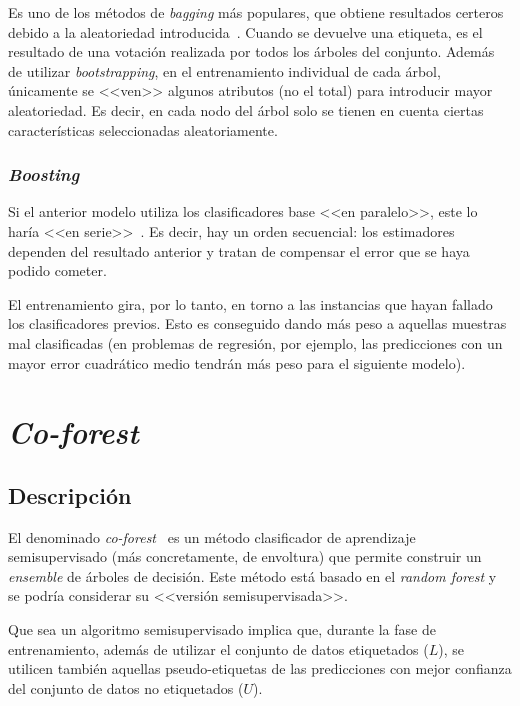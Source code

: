 Es uno de los métodos de \textit{bagging} más populares, que obtiene resultados certeros debido a la aleatoriedad introducida~\cite{originalCoForest2007}. Cuando se devuelve una etiqueta, es el resultado de una votación realizada por todos los árboles del conjunto. Además de utilizar \textit{bootstrapping}, en el entrenamiento individual de cada árbol, únicamente se <<ven>> algunos atributos (no el total) para introducir mayor aleatoriedad. Es decir, en cada nodo del árbol solo se tienen en cuenta ciertas características seleccionadas aleatoriamente.
	
\subsubsection{\textit{Boosting}}

Si el anterior modelo utiliza los clasificadores base <<en paralelo>>, este lo haría <<en serie>>~\cite{engelen2018thesis}. Es decir, hay un orden secuencial: los estimadores dependen del resultado anterior y tratan de compensar el error que se haya podido cometer.

El entrenamiento gira, por lo tanto, en torno a las instancias que hayan fallado los clasificadores previos. Esto es conseguido dando más peso a aquellas muestras mal clasificadas (en problemas de regresión, por ejemplo, las predicciones con un mayor error cuadrático medio tendrán más peso para el siguiente modelo). 


\section{\textit{Co-forest}}

\subsection{Descripción}

El denominado \textit{co-forest}~\cite{originalCoForest2007} es un método clasificador de aprendizaje semisupervisado (más concretamente, de envoltura) que permite construir un \textit{ensemble} de árboles de decisión. Este método está basado en el \textit{random forest} y se podría considerar su <<versión semisupervisada>>. 

Que sea un algoritmo semisupervisado implica que, durante la fase de entrenamiento, además de utilizar el conjunto de datos etiquetados ($L$), se utilicen también aquellas pseudo-etiquetas de las predicciones con mejor confianza del conjunto de datos no etiquetados ($U$).

